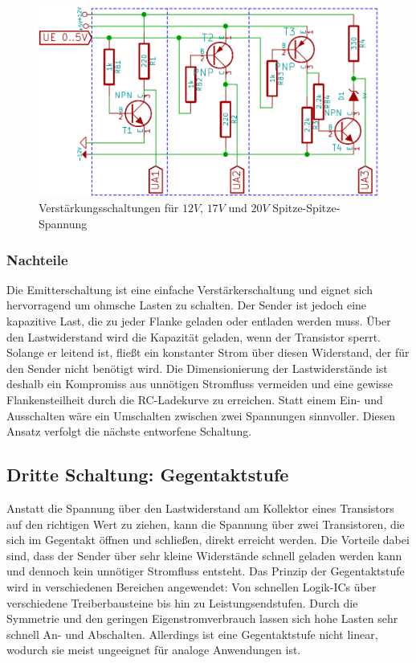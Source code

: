 \begin{figure}[H] %
\centering
\includegraphics[scale=0.6]{images/transistorschaltungen.png}
\caption{Verstärkungsschaltungen für $12V$, $17V$ und $20V$ Spitze-Spitze-Spannung} \label{img:I3}
\end{figure}

\subsubsection{Nachteile}
Die Emitterschaltung ist eine einfache Verstärkerschaltung und eignet sich hervorragend um ohmsche Lasten zu schalten. Der Sender ist jedoch eine kapazitive Last, die zu jeder Flanke geladen oder entladen werden muss. Über den Lastwiderstand wird die Kapazität geladen, wenn der Transistor sperrt. Solange er leitend ist, fließt ein konstanter Strom über diesen Widerstand, der für den Sender nicht benötigt wird. Die Dimensionierung der Lastwiderstände ist deshalb ein Kompromiss aus unnötigen Stromfluss vermeiden und eine gewisse Flankensteilheit durch die RC-Ladekurve zu erreichen. Statt einem Ein- und Ausschalten wäre ein Umschalten zwischen zwei Spannungen sinnvoller. Diesen Ansatz verfolgt die nächste entworfene Schaltung.



\subsection{Dritte Schaltung: Gegentaktstufe}
Anstatt die Spannung über den Lastwiderstand am Kollektor eines Transistors auf den richtigen Wert zu ziehen, kann die Spannung über zwei Transistoren, die sich im Gegentakt öffnen und schließen, direkt erreicht werden. Die Vorteile dabei sind, dass der Sender über sehr kleine Widerstände schnell geladen werden kann und dennoch kein unnötiger Stromfluss entsteht. Das Prinzip der Gegentaktstufe wird in verschiedenen Bereichen angewendet: Von schnellen Logik-ICs über verschiedene Treiberbausteine bis hin zu Leistungsendstufen. Durch die Symmetrie und den geringen Eigenstromverbrauch lassen sich hohe Lasten sehr schnell An- und Abschalten. Allerdings ist eine Gegentaktstufe nicht linear, wodurch sie meist ungeeignet für analoge Anwendungen ist.



